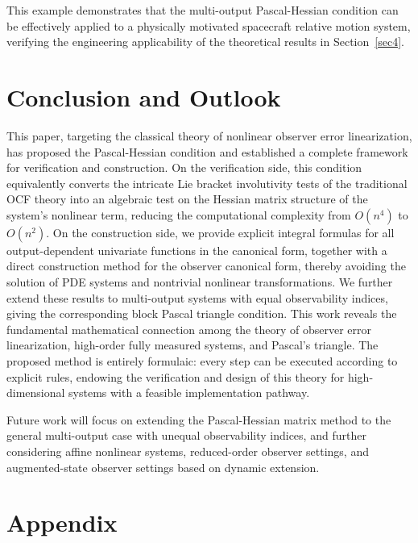 \documentclass[11pt]{article}
\begin{document}
This example demonstrates that the multi-output Pascal-Hessian condition can be effectively applied to a physically motivated spacecraft relative motion system, verifying the engineering applicability of the theoretical results in Section~\ref{sec4}.

\section{Conclusion and Outlook}\label{sec6}

This paper, targeting the classical theory of nonlinear observer error linearization, has proposed the Pascal-Hessian condition and established a complete framework for verification and construction. On the verification side, this condition equivalently converts the intricate Lie bracket involutivity tests of the traditional OCF theory into an algebraic test on the Hessian matrix structure of the system's nonlinear term, reducing the computational complexity from $O(n^4)$ to $O(n^2)$. On the construction side, we provide explicit integral formulas for all output-dependent univariate functions in the canonical form, together with a direct construction method for the observer canonical form, thereby avoiding the solution of PDE systems and nontrivial nonlinear transformations. We further extend these results to multi-output systems with equal observability indices, giving the corresponding block Pascal triangle condition. This work reveals the fundamental mathematical connection among the theory of observer error linearization, high-order fully measured systems, and Pascal's triangle. The proposed method is entirely formulaic: every step can be executed according to explicit rules, endowing the verification and design of this theory for high-dimensional systems with a feasible implementation pathway.

Future work will focus on extending the Pascal-Hessian matrix method to the general multi-output case with unequal observability indices, and further considering affine nonlinear systems, reduced-order observer settings, and augmented-state observer settings based on dynamic extension.


\appendix
\section*{\centering\LARGE Appendix}
\makeatletter
\renewcommand{\section}{\@startsection{section}{1}{\z@}%
	{-3.5ex \@plus -1ex \@minus -.2ex}%
	{2.3ex \@plus.2ex}%
	{\normalfont\large\bfseries}}
\makeatother
\end{document}
